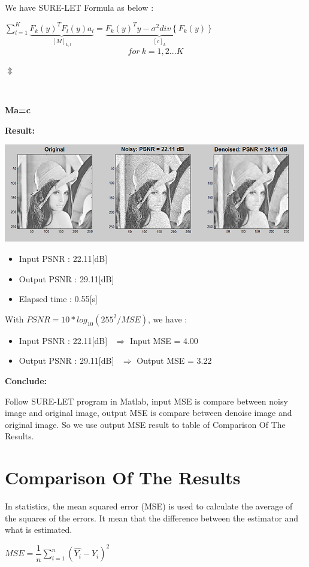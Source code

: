 \documentclass[10pt]{article}
\begin{document}
We have SURE-LET Formula as below :

$\displaystyle\sum_{l=1}^{K}\underbrace{F_k(y)^T F_l(y)a_l}_{[M]_{k,l}} = \underbrace{F_k(y)^Ty-\sigma^2div\left\{F_k(y)\right\}}_{[c]_k}$    $$for \ k = 1,2...K$$	
\begin{center}
	$\Updownarrow$ \ \ \ \ \ \ \ \ \ \ \ \ \ \ \ \ \ \ \ \ \
	
	\
	
	\textbf{Ma=c} \ \ \ \ \ \ \ \ \ \ \ \ \ \ \ \ \ \ \ \
\end{center}

\textbf{Result:}

\includegraphics{surelet1.png}

\begin{itemize}
	\item Input PSNR   : 22.11[dB] 
	\item Output PSNR  : 29.11[dB]
	\item Elapsed time : 0.55[s]
\end{itemize}

With \textbf{$PSNR = 10*log_{10}(255^2/MSE)$}, we have :
\begin{itemize}
	\item Input PSNR   : 22.11[dB] \ $\Rightarrow$ Input MSE = 4.00
	\item Output PSNR  : 29.11[dB] \ $\Rightarrow$ Output MSE = 3.22
\end{itemize}
\textbf{Conclude:}

Follow SURE-LET program in Matlab, input MSE is compare between noisy image and original image, output MSE is compare between denoise image and original image. So we use output MSE result to table of Comparison Of The Results.

\section{ Comparison Of The Results }
In statistics, the mean squared error (MSE) is used to calculate the average of the squares of the errors. It mean that the difference between the estimator and what is estimated.
\begin{center}
$MSE =  \dfrac{1}{n} \displaystyle \sum_{i=1}^{n}(\hat{Y_i} - Y_i)^2$
	
\end{center}
\end{document}
